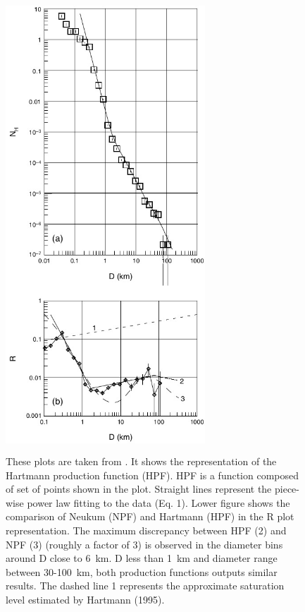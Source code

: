 \documentclass[11pt]{article}
\begin{document}
\begin{figure}[H]
	\centering
	\includegraphics[width=75mm,height=170mm,  scale=0.8]{files/lunar_functions/HPF.jpg}
	\caption{These plots are taken from \cite{ivanov2002comparison}. It shows the representation of the Hartmann production function (HPF). HPF is a function composed of set of
		points shown in the plot. Straight lines represent the piece-wise
		power law fitting to the data (Eq. 1). Lower figure shows the comparison of Neukum (NPF) and Hartmann (HPF)
		in the R plot representation. The maximum discrepancy between
		HPF (2) and NPF (3) (roughly a factor of 3) is observed in the
		diameter bins around D close to \SI{6}{km}. D less than \SI{1}{km} and diameter range between 30-\SI{100}{km}, both production functions outputs similar results. The dashed line 1 represents the approximate saturation level estimated by Hartmann (1995).}
	\label{HPF}
\end{figure}
\end{document}
